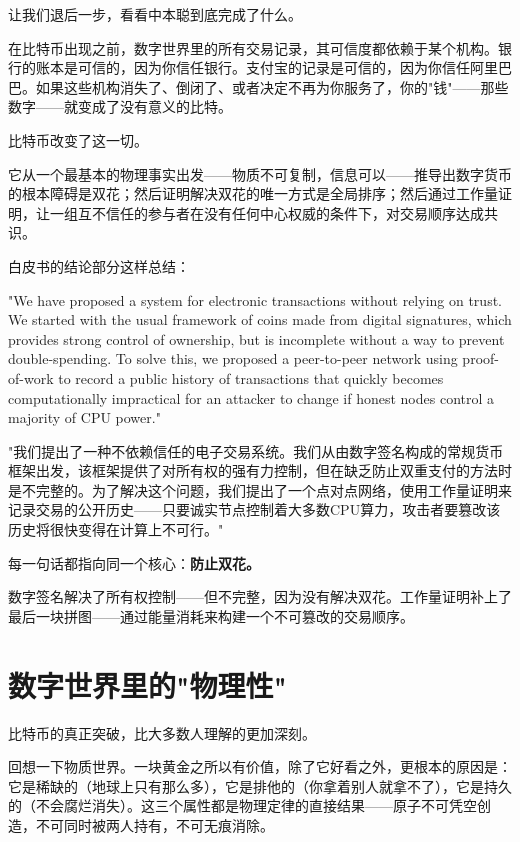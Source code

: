 \documentclass[a4paper,12pt,openany]{ctexbook}
\newenvironment{quoting}{%
  \par\vspace{0.5em}%
  \begin{list}{}{%
    \setlength{\leftmargin}{2em}%
    \setlength{\rightmargin}{2em}%
    \setlength{\parsep}{0.3em}%
    \setlength{\itemsep}{0pt}%
    \setlength{\topsep}{0pt}%
  }%
  \item\relax
}{%
  \end{list}%
  \par\vspace{0.5em}%
}
\begin{document}
让我们退后一步，看看中本聪到底完成了什么。

在比特币出现之前，数字世界里的所有交易记录，其可信度都依赖于某个机构。银行的账本是可信的，因为你信任银行。支付宝的记录是可信的，因为你信任阿里巴巴。如果这些机构消失了、倒闭了、或者决定不再为你服务了，你的"钱"——那些数字——就变成了没有意义的比特。

比特币改变了这一切。

它从一个最基本的物理事实出发——物质不可复制，信息可以——推导出数字货币的根本障碍是双花；然后证明解决双花的唯一方式是全局排序；然后通过工作量证明，让一组互不信任的参与者在没有任何中心权威的条件下，对交易顺序达成共识。

白皮书的结论部分这样总结：


\begin{quoting}
\small
"We have proposed a system for electronic transactions without relying on trust. We started with the usual framework of coins made from digital signatures, which provides strong control of ownership, but is incomplete without a way to prevent double-spending. To solve this, we proposed a peer-to-peer network using proof-of-work to record a public history of transactions that quickly becomes computationally impractical for an attacker to change if honest nodes control a majority of CPU power."

"我们提出了一种不依赖信任的电子交易系统。我们从由数字签名构成的常规货币框架出发，该框架提供了对所有权的强有力控制，但在缺乏防止双重支付的方法时是不完整的。为了解决这个问题，我们提出了一个点对点网络，使用工作量证明来记录交易的公开历史——只要诚实节点控制着大多数CPU算力，攻击者要篡改该历史将很快变得在计算上不可行。"
\end{quoting}


每一句话都指向同一个核心：\textbf{防止双花。}

数字签名解决了所有权控制——但不完整，因为没有解决双花。工作量证明补上了最后一块拼图——通过能量消耗来构建一个不可篡改的交易顺序。


\section*{数字世界里的"物理性"}


比特币的真正突破，比大多数人理解的更加深刻。

回想一下物质世界。一块黄金之所以有价值，除了它好看之外，更根本的原因是：它是稀缺的（地球上只有那么多），它是排他的（你拿着别人就拿不了），它是持久的（不会腐烂消失）。这三个属性都是物理定律的直接结果——原子不可凭空创造，不可同时被两人持有，不可无痕消除。
\end{document}
